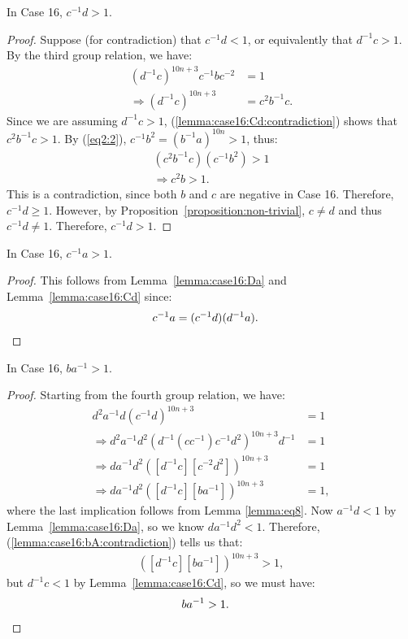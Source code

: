 \begin{lemma} In Case 16, $c^{-1}d>1$.
\label{lemma:case16:Cd}
\end{lemma}
\begin{proof} Suppose (for contradiction) that $c^{-1}d<1$, or equivalently that $d^{-1}c>1$. By the third group relation, we have:
\begin{align}
(d^{-1}c)^{10n+3}c^{-1}bc^{-2}&=1\nonumber{}\\
\Rightarrow{}(d^{-1}c)^{10n+3}&=c^{2}b^{-1}c.\label{lemma:case16:Cd:contradiction}
\end{align}
Since we are assuming $d^{-1}c>1$, (\ref{lemma:case16:Cd:contradiction}) shows that $c^{2}b^{-1}c>1$. By (\ref{eq2:2}), $c^{-1}b^{2}=(b^{-1}a)^{10n}>1$, thus:
\begin{align*}
(c^{2}b^{-1}c)(c^{-1}b^{2})>1\\
\Rightarrow{}c^{2}b>1.
\end{align*}
This is a contradiction, since both $b$ and $c$ are negative in Case 16. Therefore, $c^{-1}d\geq{}1$. However, by Proposition~\ref{proposition:non-trivial}, $c\neq{}d$ and thus $c^{-1}d\neq{}1$. Therefore, $c^{-1}d>1$.
\end{proof}

\begin{corollary} In Case 16, $c^{-1}a>1$.
\label{lemma:case16:Ca}
\end{corollary}
\begin{proof}
This follows from Lemma~\ref{lemma:case16:Da} and Lemma~\ref{lemma:case16:Cd} since:
\begin{align*}
c^{-1}a&=(c^{-1}d)(d^{-1}a).\qedhere
\end{align*}
\end{proof}

\begin{lemma} In Case 16, $ba^{-1}>1$.
\label{lemma:case16:bA}
\end{lemma}
\begin{proof}
Starting from the fourth group relation, we have:
\begin{align}
d^{2}a^{-1}d(c^{-1}d)^{10n+3}&=1\nonumber{}\\
\Rightarrow{}d^{2}a^{-1}d^{2}(d^{-1}(cc^{-1})c^{-1}d^{2})^{10n+3}d^{-1}&=1\nonumber{}\\
\Rightarrow{}da^{-1}d^{2}([d^{-1}c][c^{-2}d^{2}])^{10n+3}&=1\nonumber{}\\
\Rightarrow{}da^{-1}d^{2}([d^{-1}c][ba^{-1}])^{10n+3}&=1,\label{lemma:case16:bA:contradiction}
\end{align}
where the last implication follows from Lemma \ref{lemma:eq8}. Now $a^{-1}d<1$ by Lemma~\ref{lemma:case16:Da}, so we know $da^{-1}d^{2}<1$. Therefore, (\ref{lemma:case16:bA:contradiction}) tells us that:
\begin{align*}
([d^{-1}c][ba^{-1}])^{10n+3}>1,
\end{align*}
but $d^{-1}c<1$ by Lemma~\ref{lemma:case16:Cd}, so we must have:
\begin{align*}
ba^{-1}&>1.\qedhere
\end{align*}
\end{proof}



